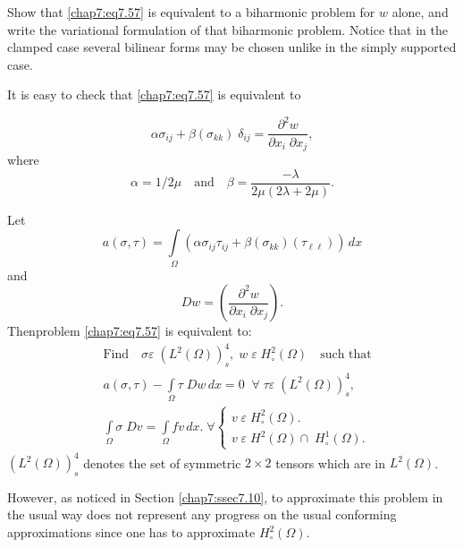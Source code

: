 \begin{exercise}\label{chap7:exr6}
Show that \eqref{chap7:eq7.57} is equivalent to a biharmonic problem
for $w$ alone, and write the variational formulation of that
biharmonic problem. Notice that in the clamped case several bilinear
forms may be chosen unlike in the simply supported case.
\end{exercise}

It is easy to check that \eqref{chap7:eq7.57} is equivalent to 

\setcounter{equation}{57}
\begin{equation}\label{chap7:eq7.58}
\alpha\sigma_{ij}+\beta(\sigma_{kk})\;\delta_{ij}= \frac{\partial^2w}
{\partial x_i\;\partial x_j},
\end{equation}
where
$$
\alpha=1/2\mu\quad\text{and}\quad\beta=\frac{-\lambda}
{2\mu(2\lambda+2\mu)}.
$$

Let 
$$
a(\sigma,\tau)=\int\limits_\Omega(\alpha\sigma_{ij}\tau_{ij}+
\beta(\sigma_{kk})(\tau_{\ell\ell}))\,dx
$$
and 
$$
Dw=\left(\frac{\partial^2w}{\partial x_i\;\partial x_j}\right).
$$
Then\pageoriginale problem \eqref{chap7:eq7.57} is equivalent to:
\begin{align*}
&\text{Find}\quad\sigma\varepsilon \;(L^2(\Omega))_s^4,\;w\;\varepsilon
\;H_\circ^2(\Omega)\quad\text{such that}\\
&a(\sigma,\tau)-\int\limits_\Omega\tau \;Dw\,dx=0\; \; \forall
\;\tau\varepsilon \;(L^2(\Omega))_s^4,\\
&\int\limits_\Omega\sigma \;Dv=\int\limits_\Omega fv\,dx. \;\forall 
\begin{cases}
v\;\varepsilon \;H_\circ^2(\Omega).\\
v\;\varepsilon \;H^2(\Omega)\cap \;H_\circ^1(\Omega).
\end{cases}
\end{align*}
$(L^2(\Omega))_s^4$ denotes the set of symmetric $2\times 2$ tensors
which are in $L^2(\Omega)$.

However, as noticed in Section \ref{chap7:ssec7.10}, to approximate this problem 
in the usual way does not represent any progress on the usual conforming
approximations since one has to approximate $H_\circ^2(\Omega)$. 

